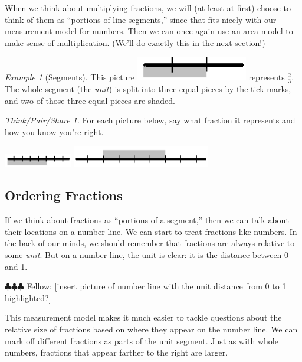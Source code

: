 \documentclass[10pt, reqno]{amsart}
\theoremstyle{remark}
\newtheorem{example}[thm]{Example}
\newtheorem*{thinkpair*}{Think/Pair/Share}
\theoremstyle{definition}
\numberwithin{equation}{section}  %
\newcommand{\fellow}[1]{{\color{magenta} \sf $\clubsuit\clubsuit\clubsuit$ Fellow: [#1]}}
\begin{document}
When we think about multiplying fractions, we will (at least at first) choose to think of them as ``portions of line segments,'' since that fits nicely with our  measurement model for numbers.  Then we can once again use an area model to make sense of multiplication.  (We'll do exactly this in the next section!)



\begin{example}[Segments]
  This picture
\includegraphics[height = .5cm]{twothirdsseg}
represents $\frac 2 3$.  The whole segment (the \emph{unit}) is split into three equal pieces by the tick marks, and two of those three equal pieces are shaded.
\end{example}

\begin{thinkpair*}
For each picture below, say what fraction it represents and how you know you're right.

\begin{center}
\includegraphics[width = 3cm]{seg2}
\qquad
\qquad
\includegraphics[width = 6cm]{seg3}
\end{center}

\end{thinkpair*}




\subsection{Ordering Fractions}
If we think about fractions as ``portions of a segment,'' then we can talk about their locations on a number line.  We can start to treat fractions like  numbers.  In the back of our minds, we should remember that fractions are always relative to some \emph{unit}.  But on a number line, the unit is clear: it is the distance between 0 and 1.

\fellow{insert picture of number line with the unit distance from 0 to 1 highlighted?}


This measurement model makes it much easier to tackle questions about the relative size of fractions based on where they appear on the number line.  We can mark off different fractions as parts of the unit segment.  Just as with whole numbers, fractions that appear farther to the right are larger.
\end{document}
